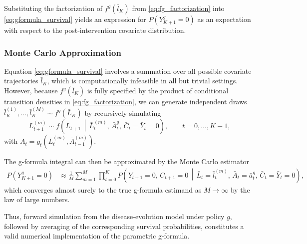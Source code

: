 Substituting the factorization of $f^g(\bar{l}_K)$ from
\eqref{eq:fg_factorization} into \eqref{eq:gformula_survival} yields an expression
for $P(Y^g_{K+1} = 0)$ as an expectation with respect to the post-intervention
covariate distribution.

\subsubsection{Monte Carlo Approximation}

Equation \eqref{eq:gformula_survival} involves a summation over all possible
covariate trajectories $\bar{l}_K$, which is computationally infeasible in
all but trivial settings. However, because $f^g(\bar{l}_K)$ is fully specified
by the product of conditional transition densities in
\eqref{eq:fg_factorization}, we can generate independent draws
$\bar{l}^{(1)}_K,\ldots,\bar{l}^{(M)}_K \sim f^g(\bar{L}_K)$
by recursively simulating
\[
L_{t+1}^{(m)} \sim
f\!\left(
L_{t+1}
\,\middle|\,
\bar{L}^{(m)}_t,\,
\bar{A}^{g}_t,\,
\bar{C}_t = \bar{Y}_t = 0
\right),
\qquad
t = 0,\ldots,K-1,
\]
with $A_t = g_t(\bar{L}^{(m)}_t,\bar{A}^{(m)}_{t-1})$.

The g-formula integral can then be approximated by the Monte Carlo estimator
\begin{align}
P(Y^g_{K+1} = 0)
&\approx
\frac{1}{M}
\sum_{m=1}^{M}
\prod_{t=0}^{K}
P\!\left(
Y_{t+1} = 0,\,
C_{t+1} = 0
\,\middle|\,
\bar{L}_t = \bar{l}^{(m)}_t,\,
\bar{A}_t = \bar{a}^g_t,\,
\bar{C}_t = \bar{Y}_t = 0
\right),
\end{align}
which converges almost surely to the true g-formula estimand as
$M \to \infty$ by the law of large numbers.

Thus, forward simulation from the disease-evolution model under policy $g$,
followed by averaging of the corresponding survival probabilities, constitutes
a valid numerical implementation of the parametric g-formula.

